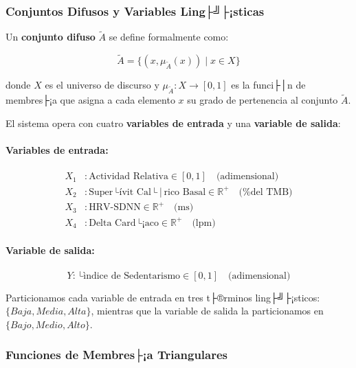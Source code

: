 \subsubsection{Conjuntos Difusos y Variables Ling├╝├¡sticas}
\label{subsubsec:conjuntos_difusos}

Un \textbf{conjunto difuso} \(\tilde{A}\) se define formalmente como:

\begin{equation}
\tilde{A} = \{(x, \mu_{\tilde{A}}(x)) \mid x \in X\}
\label{eq:conjunto_difuso}
\end{equation}

donde \(X\) es el universo de discurso y \(\mu_{\tilde{A}}: X \rightarrow [0, 1]\) es la funci├│n de membres├¡a que asigna a cada elemento \(x\) su grado de pertenencia al conjunto \(\tilde{A}\).

El sistema opera con cuatro \textbf{variables de entrada} y una \textbf{variable de salida}:

\paragraph{Variables de entrada:}
\begin{align}
X_1 &: \text{Actividad Relativa} \in [0, 1] \quad \text{(adimensional)} \label{eq:var_actividad} \\
X_2 &: \text{Super├ívit Cal├│rico Basal} \in \mathbb{R}^+ \quad \text{(\% del TMB)} \label{eq:var_superavit} \\
X_3 &: \text{HRV-SDNN} \in \mathbb{R}^+ \quad \text{(ms)} \label{eq:var_hrv} \\
X_4 &: \text{Delta Card├¡aco} \in \mathbb{R}^+ \quad \text{(lpm)} \label{eq:var_delta}
\end{align}

\paragraph{Variable de salida:}
\begin{equation}
Y: \text{├ìndice de Sedentarismo} \in [0, 1] \quad \text{(adimensional)}
\label{eq:var_salida}
\end{equation}

Particionamos cada variable de entrada en tres t├®rminos ling├╝├¡sticos: \(\{Baja, Media, Alta\}\), mientras que la variable de salida la particionamos en \(\{Bajo, Medio, Alto\}\).

\subsubsection{Funciones de Membres├¡a Triangulares}
\label{subsubsec:funciones_membresia}

